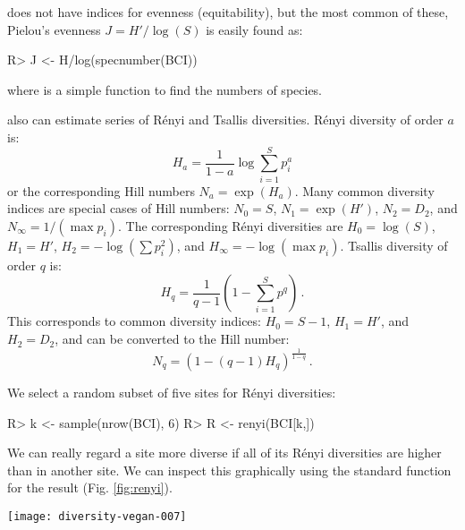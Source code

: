 \documentclass[article,nojss]{jss}
\begin{document}
 does not have indices for evenness (equitability), but
the most common of these, Pielou's evenness $J = H'/\log(S)$ is easily
found as:
\begin{Schunk}
\begin{Sinput}
R> J <- H/log(specnumber(BCI))
\end{Sinput}
\end{Schunk}
where  is a simple  function to find
the numbers of species.

 also can estimate series of R\'{e}nyi and Tsallis
diversities. R{\'e}nyi diversity of order $a$ is:
\begin{equation}
H_a = \frac{1}{1-a} \log \sum_{i=1}^S p_i^a
\end{equation}
or the corresponding Hill numbers $N_a = \exp(H_a)$.  Many common
diversity indices are special cases of Hill numbers: $N_0 = S$, $N_1 =
\exp(H')$, $N_2 = D_2$, and $N_\infty = 1/(\max p_i)$. The
corresponding R\'{e}nyi diversities are $H_0 = \log(S)$, $H_1 = H'$, $H_2 =
- \log(\sum p_i^2)$, and $H_\infty = - \log(\max p_i)$.  
Tsallis diversity of order $q$ is:
\begin{equation}
  H_q = \frac{1}{q-1} \left(1 - \sum_{i=1}^S p^q \right) \, .
\end{equation}
This corresponds to common diversity indices: $H_0 = S-1$, $H_1 = H'$,
and $H_2 = D_2$, and can be converted to the Hill number:
\begin{equation}
  N_q = (1 - (q-1) H_q )^\frac{1}{1-q} \, .
\end{equation}

We select a random subset of five sites for R\'{e}nyi diversities:
\begin{Schunk}
\begin{Sinput}
R> k <- sample(nrow(BCI), 6)
R> R <- renyi(BCI[k,])
\end{Sinput}
\end{Schunk}
We can really regard a site more diverse if all of its R\'{e}nyi
diversities are higher than in another site.  We can inspect this
graphically using the standard  function for the
 result (Fig. \ref{fig:renyi}).
\begin{SCfigure}
\texttt{[image: diversity-vegan-007]}
\caption{R\'{e}nyi diversities in six randomly selected plots. The plot
  uses Trellis graphics with a separate panel for each site. The dots
  show the values for sites, and the lines the extremes and median in
  the data set.}
\label{fig:renyi}
\end{SCfigure}
\end{document}
